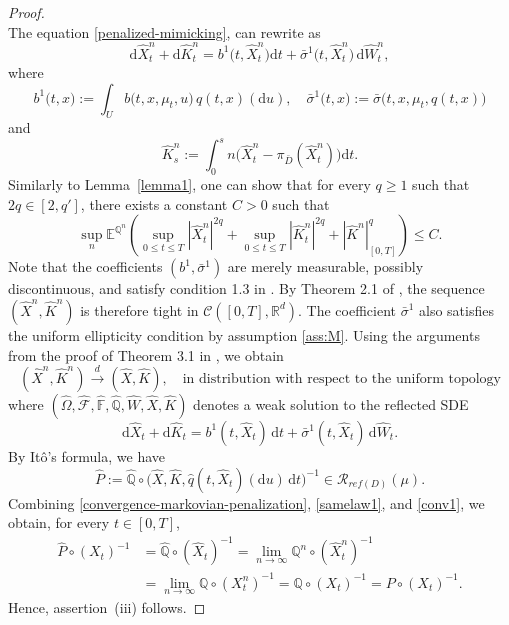 \documentclass[11pt,amsfonts]{article}
\theoremstyle{plain}
\theoremstyle{assumpstyle}
\numberwithin{equation}{section}
\numberwithin{theorem}{section}
\numberwithin{proposition}{section}
\numberwithin{definition}{section}
\numberwithin{remark}{section}
\numberwithin{corollary}{section}
\numberwithin{lemma}{section}
\begin{document}
\begin{proof}
\begin{equation}
\end{equation} 
The equation \eqref{penalized-mimicking}, can rewrite as 
\begin{equation} 
\mathrm{d}\hat{X}^n_t+ \mathrm{d}\hat{K}^n_t = b^1\big(t, \hat{X}^n_t\big) \mathrm{d}t + \bar{\sigma}^1\big(t, \hat{X}^n_t\big)\, \mathrm{d}\hat{W}^n_t ,
\end{equation}
where 
\begin{equation*} b^1\big(t, x\big):=\int_{U} b\big(t, x, \mu_t, u\big)\, q(t, x)(\mathrm{d}u), \quad\bar{\sigma}^1\big(t, x\big):=\bar{\sigma}\big(t, x, \mu_t, q(t, x)\big) 
\end{equation*}
and 
$$\hat{K}^n_s:= \displaystyle\int_{0}^{s} n \big( \hat{X}^n_t - \pi_{\bar{D}}(\hat{X}^n_t) \big)\mathrm{d}t.$$
Similarly to Lemma~\ref{lemma1}, one can show that for every $q \ge 1$ such that $2q \in [2, q']$, there exists a constant $C > 0$ such that 
\begin{equation}\label{Dom-measurable} 
\sup_{n} \mathbb{E}^{\mathbb{Q}^n} \left( \sup_{0 \le t \le T} |\hat{X}^n_t|^{2q} + \sup_{0 \le t \le T} |\hat{K}^n_t|^{2q} + |\hat{K}^n|_{[0,T]}^{q} \right) \le C. 
\end{equation}
Note that the coefficients $(b^{1}, \bar{\sigma}^{1})$ are merely measurable, possibly discontinuous, and satisfy condition 1.3 in \cite{Slominski-measurable}. By Theorem 2.1 of \cite{Slominski-measurable}, the sequence $(\hat{X}^{n}, \hat{K}^{n})$ is therefore tight in $\mathcal{C}([0,T], \mathbb{R}^{d})$. The coefficient $\bar{\sigma}^{1}$ also satisfies the uniform ellipticity condition by assumption \ref{ass:M}. Using the arguments from the proof of Theorem 3.1 in \cite{Slominski-measurable}, we obtain 
\begin{equation}\label{convergence-markovian-penalization}
(\hat{X}^{n}, \hat{K}^{n}) \xrightarrow{d} (\hat{X}, \hat{K}), \quad \text{in distribution with respect to the uniform topology}
\end{equation}
where $(\hat{\Omega},\hat{\mathcal{F}},\hat{\mathbb{F}},\hat{\mathbb{Q}},\hat{W},\hat{X},\hat{K})$ denotes a weak solution to the reflected SDE
\begin{equation}\label{eq.Markovian1}
\mathrm{d}\hat{X}_t+ \mathrm{d}\hat{K}_t
= b^{1}(t,\hat{X}_t)\,\mathrm{d}t
+ \bar{\sigma}^{1}(t,\hat{X}_t)\,\mathrm{d}\hat{W}_t
 .
\end{equation} 
By Itô’s formula, we have 
\begin{equation}\label{first-prop}
\hat{P}
:= \hat{\mathbb{Q}} \circ \big(\hat{X}, \hat{K},
\hat{q}(t,\hat{X}_t)(\mathrm{d}u)\,\mathrm{d}t\big)^{-1}
\in \mathcal{R}_{ref(D)}(\mu).
\end{equation}  
Combining \eqref{convergence-markovian-penalization}, \eqref{samelaw1}, and \eqref{conv1}, we obtain, for every $t \in [0,T]$,
\begin{align*}
\hat{P}\circ (X_t)^{-1}
&= \hat{\mathbb{Q}}\circ (\hat{X}_t)^{-1}
= \lim_{n\to\infty} \mathbb{Q}^n \circ (\hat{X}^n_t)^{-1} \\
&= \lim_{n\to\infty} \mathbb{Q} \circ (X^n_t)^{-1}
= \mathbb{Q} \circ (X_t)^{-1}
= P \circ (X_t)^{-1}.
\end{align*}
Hence, assertion~(iii) follows.


\end{proof}
\end{document}
